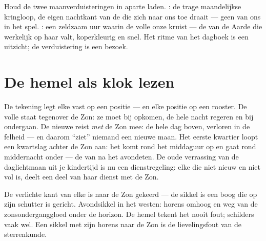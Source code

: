 \begin{example}\label{ex:g7:moon-phases:eclipsevs}
Houd de twee maanverduisteringen in aparte laden.
\emph{}: de trage maandelijkse kringloop, de eigen
nachtkant van de  die zich naar ons toe draait --- geen
 van ons in het spel. \emph{}: een
zeldzaam uur waarin de volle  onze  kruist --- de
 van de Aarde die werkelijk op haar valt, koperkleurig en
snel. Het ritme van het dagboek is een uitzicht; de verduistering is
een bezoek.
\end{example}

\section{De hemel als klok lezen}

\begin{example}\label{ex:g7:moon-phases:hours}
De tekening legt elke  vast op een positie --- en elke
positie op een rooster. De volle  staat tegenover de Zon: ze
moet bij  opkomen, de hele nacht regeren en bij
 ondergaan. De nieuwe  reist \emph{met} de Zon mee:
de hele dag boven, verloren in de felheid --- en daarom ``ziet''
niemand een nieuwe maan. Het eerste kwartier loopt een kwartslag
achter de Zon aan: het komt rond het middaguur op en gaat rond
middernacht onder --- de  van na het avondeten. De oude
verrassing van de daglichtmaan uit je kindertijd is nu een
dienstregeling: elke  die niet nieuw en niet vol is, deelt een
deel van haar dienst met de Zon.
\end{example}

\begin{example}\label{ex:g7:moon-phases:points}
De verlichte kant van elke  is naar de Zon gekeerd ---
de sikkel is een boog die op zijn schutter is gericht. Avondsikkel in
het westen: horens omhoog en weg van de zonsonderganggloed onder de
horizon. De hemel tekent het nooit fout; schilders vaak wel. Een
sikkel met zijn horens naar de Zon is de lievelingsfout van de
sterrenkunde.
\end{example}

